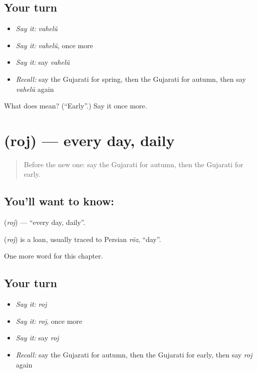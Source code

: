 \subsection*{Your turn}
\begin{itemize}
\raggedright
  \item \emph{Say it:} \emph{vahelũ}
  \item \emph{Say it:} \emph{vahelũ}, once more
  \item \emph{Say it:} say \emph{vahelũ}
  \item \emph{Recall:} say the Gujarati for spring, then the Gujarati for autumn, then say \emph{vahelũ} again
\end{itemize}

\begin{tcolorbox}[breakable,colback=teal!4,colframe=teal!35!black,title={Before you move on}]
What does  mean? (\textquotedblleft{}Early\textquotedblright{}.) Say it once more.
\end{tcolorbox}
\section[\texorpdfstring{\gu{રોજ} (roj)}{રોજ (roj)}]{ (roj) — every day, daily}

\label{lesson:GU-C94-roj}



\begin{quote}
Before the new one: say the Gujarati for autumn, then the Gujarati for early.
\end{quote}

\subsection*{You'll want to know: }
\textbf{} (\emph{roj}) — \textquotedblleft{}every day, daily\textquotedblright{}.

\begin{cousinweb}
\textbf{} (\emph{roj}) is a loan, usually traced to Persian \emph{rōz}, \textquotedblleft{}day\textquotedblright{}.
\end{cousinweb}

\begin{grammarlens}[title={What you've built}]
One more word for this chapter.
\end{grammarlens}

\subsection*{Your turn}
\begin{itemize}
\raggedright
  \item \emph{Say it:} \emph{roj}
  \item \emph{Say it:} \emph{roj}, once more
  \item \emph{Say it:} say \emph{roj}
  \item \emph{Recall:} say the Gujarati for autumn, then the Gujarati for early, then say \emph{roj} again
\end{itemize}

